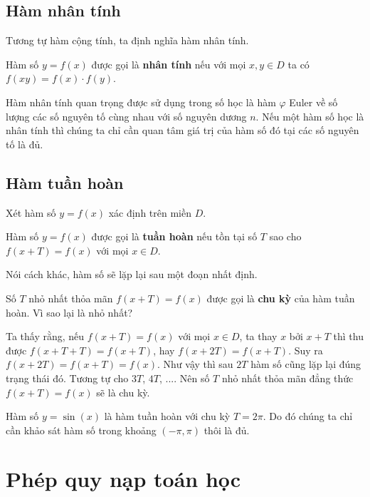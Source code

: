 \subsection*{Hàm nhân tính}

Tương tự hàm cộng tính, ta định nghĩa hàm nhân tính.

\begin{definition}
    Hàm số $y = f(x)$ được gọi là \textbf{nhân tính} nếu với mọi $x, y \in D$
    ta có $f(xy) = f(x) \cdot f(y)$.
\end{definition}

Hàm nhân tính quan trọng được sử dụng trong số học là hàm $\varphi$ Euler về số lượng các số nguyên tố cùng nhau với số nguyên dương $n$. Nếu một hàm số học là nhân tính thì chúng ta chỉ cần quan tâm giá trị của hàm số đó tại các số nguyên tố là đủ.

\subsection*{Hàm tuần hoàn}

Xét hàm số $y=f(x)$ xác định trên miền $D$.

\begin{definition}
    Hàm số $y=f(x)$ được gọi là \textbf{tuần hoàn} nếu tồn tại số $T$ sao cho $f(x+T) = f(x)$ với mọi $x \in D$.
\end{definition}

Nói cách khác, hàm số sẽ lặp lại sau một đoạn nhất định.

Số $T$ nhỏ nhất thỏa mãn $f(x+T) = f(x)$ được gọi là \textbf{chu kỳ} của hàm tuần hoàn. Vì sao lại là nhỏ nhất?

Ta thấy rằng, nếu $f(x+T) = f(x)$ với mọi $x \in D$, ta thay $x$ bởi $x + T$ thì thu được $f(x + T + T) = f(x+T)$, hay $f(x+2T) = f(x+T)$. Suy ra $f(x+2T) = f(x+T) = f(x)$. Như vậy thì sau $2T$ hàm số cũng lặp lại đúng trạng thái đó. Tương tự cho $3T$, $4T$, .... Nên số $T$ nhỏ nhất thỏa mãn đẳng thức $f(x+T) = f(x)$ sẽ là chu kỳ.

\begin{example}
    Hàm số $y = \sin(x)$ là hàm tuần hoàn với chu kỳ $T = 2\pi$. Do đó chúng ta chỉ cần khảo sát hàm số trong khoảng $(-\pi, \pi)$ thôi là đủ.
\end{example}

\section{Phép quy nạp toán học}

